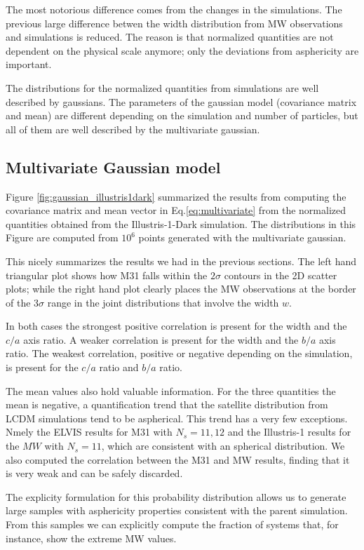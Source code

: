 \documentclass[a4paper,fleqn,usenatbib]{mnras}
\begin{document}
The most notorious difference comes from the changes in the
simulations. 
The previous large difference betwen the width distribution from
MW observations and simulations is reduced. 
The reason is that normalized quantities are not dependent on the
physical scale anymore; only the deviations from asphericity are
important.

The distributions for the normalized quantities from simulations are
well described by gaussians. 
The parameters of the gaussian model (covariance matrix and mean)
are different depending on the simulation and number of particles, but
all of them are well described by the multivariate gaussian.

\subsection{Multivariate Gaussian model}

Figure \ref{fig:gaussian_illustris1dark} summarized the results from
 computing the covariance matrix and mean vector in
 Eq.\ref{eq:multivariate} from the normalized quantities obtained from
 the Illustris-1-Dark simulation.
The distributions in this Figure are computed from $10^6$ points
generated with the multivariate gaussian. 

This nicely summarizes the results we had in the previous
sections. 
The left hand triangular plot shows how M31 falls within the $2\sigma$
contours in the 2D scatter plots;
while the right hand plot clearly places the MW observations at the
border of the $3\sigma$ range in the joint distributions that involve
the width $w$.  

In both cases the strongest positive correlation is present for the
width and the $c/a$ axis ratio. 
A weaker correlation is present for the width and the $b/a$ axis
ratio.  
The weakest correlation, positive or negative depending on the
simulation, is present for the $c/a$ ratio and $b/a$ ratio.

The mean values also hold valuable information. 
For the three quantities the mean is negative, a quantification trend
that the satellite distribution from LCDM simulations tend to be aspherical.
This trend has a very few exceptions. 
Nmely the ELVIS results for M31 with $N_s=11,12$ and the Illustris-1
results for the $MW$ with $N_s=11$, which are consistent with an
spherical distribution. 
We also computed the correlation between the M31 and MW results,
finding that it is very weak and can be safely discarded. 

The explicity formulation for this probability distribution allows us
to generate large samples with asphericity properties consistent with
the parent simulation. 
From this samples we can explicitly compute the fraction of systems
that, for instance, show the extreme MW values.
\end{document}

